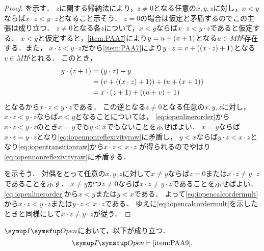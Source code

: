 \begin{proof}
	を示す．
	\(z\)に関する帰納法により，\(z \neq 0\)となる任意の\(x, y, z\)に対し，\(x < y\)ならば\(x \cdot z < y \cdot z\)となること示そう．
	\(z = 0\)の場合は仮定と矛盾するのでこの主張は成り立つ．
	\(z \neq 0\)となる各\(z\)について，\(x < y\)ならば\(x \cdot z < y \cdot z\)であると仮定する．
	\(x < y\)と仮定すると，\cref{item:PAA7}により\(y = u + \paren{x + 1}\)となる\(u \in M\)が存在する．また，
	\(x \cdot z < y \cdot z\)だから\cref{item:PAA7}により\(y \cdot z = v + \paren{\paren{x \cdot z} + 1}\)となる\(v \in M\)がとれる．
	このとき，
	\begin{align*}
		y \cdot \paren{z + 1}
		 & = \paren{y \cdot z} + y                                                 \\
		 & = \paren{v + \paren{\paren{x \cdot z} + 1}} + \paren{u + \paren{x + 1}} \\
		 & = x \cdot \paren{z + 1} + \paren{\paren{u + v} + 1}
	\end{align*}
	となるから\(x \cdot z < y \cdot z\)である．
	この逆となる\(z \neq 0\)となる任意の\(x, y, z\)に対し，\(x \cdot z < y \cdot z\)ならば\(x < y\)となることについては，
	\cref{eq:iopenlinerorder}から\(x \cdot z < y \cdot z\)のとき\(x = y\)でも\(y < x\)でもないことを示せばよい．
	\(x = y\)ならば\(x \cdot z = y \cdot z\)となり\cref{eq:iopennonreflexivityraw}に矛盾し，
	\(y < x\)ならば\(y \cdot z < x \cdot z\)となり\cref{eq:iopentransitionraw}から\(x \cdot z < x \cdot z\)
	が得られるのでやはり\cref{eq:iopennonreflexivityraw}に矛盾する．

	を示そう．
	対偶をとって任意の\(x, y, z\)に対して\(x \neq y\)ならば\(z = 0\)または\(x \cdot z \neq y \cdot z\)であることを示す．
	\(x \neq y\)かつ\(z \neq 0\)ならば\(x \cdot z \neq y \cdot z\)であることを示せばよい．
	\cref{eq:iopenlinerorder}から\(x < y\)または\(y < x\)である．
	よって\cref{eq:iopencalcordermult}から\(x \cdot z < y \cdot z\)または\(y \cdot z < x \cdot z\)である．
	ゆえに\cref{eq:iopencalcordermult}を示したときと同様にして\(x \cdot z \neq y \cdot z\)が従う．
\end{proof}

\begin{Lemma} \label{Lemma:iopenPAA9redudant}
	\(\OpenFormulaInduction\)において，以下が成り立つ．
	\begin{equation}
		\OpenFormulaInduction \provable \text{\cref{item:PAA9}}.
		\label{eq:iopenPAA9redudant}
	\end{equation}
\end{Lemma}


